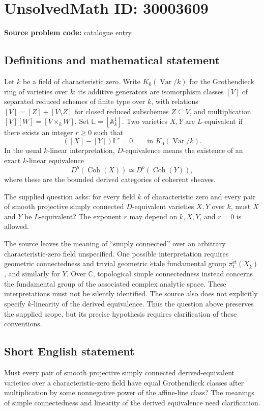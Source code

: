 \documentclass[11pt]{article}
\newcommand{\C}{\mathbb{C}}
\begin{document}
\section*{UnsolvedMath ID: 30003609}
\textbf{Source problem code:} catalogue entry
\subsection{Definitions and mathematical statement}
Let \(k\) be a field of characteristic zero. Write \(K_0(\operatorname{Var}/k)\) for the Grothendieck ring of varieties over \(k\): its additive generators are isomorphism classes \([V]\) of separated reduced schemes of finite type over \(k\), with relations \([V]=[Z]+[V\setminus Z]\) for closed reduced subschemes \(Z\subseteq V\), and multiplication \([V][W]=[V\times_k W]\). Set \(\mathbb L=[\mathbb A^1_k]\). Two varieties \(X,Y\) are \(L\)-equivalent if there exists an integer \(r\geq 0\) such that
\[
([X]-[Y])\mathbb L^r=0\qquad\text{in }K_0(\operatorname{Var}/k).
\]
In the usual \(k\)-linear interpretation, \(D\)-equivalence means the existence of an exact \(k\)-linear equivalence
\[
D^b(\operatorname{Coh}(X))\simeq D^b(\operatorname{Coh}(Y)),
\]
where these are the bounded derived categories of coherent sheaves.

The supplied question asks: for every field \(k\) of characteristic zero and every pair of smooth projective simply connected \(D\)-equivalent varieties \(X,Y\) over \(k\), must \(X\) and \(Y\) be \(L\)-equivalent? The exponent \(r\) may depend on \(k,X,Y\), and \(r=0\) is allowed.

The source leaves the meaning of ``simply connected'' over an arbitrary characteristic-zero field unspecified. One possible interpretation requires geometric connectedness and trivial geometric \(\acute{e}\)tale fundamental group \(\pi_1^{\mathrm{\acute{e}t}}(X_{\bar k})\), and similarly for \(Y\). Over \(\C\), topological simple connectedness instead concerns the fundamental group of the associated complex analytic space. These interpretations must not be silently identified. The source also does not explicitly specify \(k\)-linearity of the derived equivalence. Thus the question above preserves the supplied scope, but its precise hypothesis requires clarification of these conventions.
\subsection{Short English statement}
Must every pair of smooth projective simply connected derived-equivalent varieties over a characteristic-zero field have equal Grothendieck classes after multiplication by some nonnegative power of the affine-line class? The meanings of simple connectedness and linearity of the derived equivalence need clarification.
\end{document}
